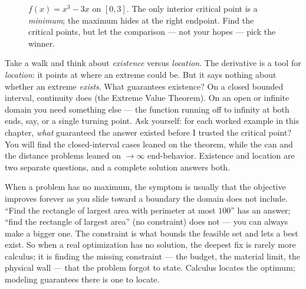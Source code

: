 \begin{figure}[H]
\centering
{}
\caption{$f(x)=x^3-3x$ on $[0,3]$. The only interior critical point is a
\emph{minimum}; the maximum hides at the right endpoint. Find the critical points,
but let the comparison --- not your hopes --- pick the winner.}
\label{ch17:fig-endpoint}
\end{figure}

\begin{walkbox}
Take a walk and think about \emph{existence} versus \emph{location}. The derivative
is a tool for \emph{location}: it points at where an extreme could be. But it says
nothing about whether an extreme \emph{exists}. What guarantees existence? On a closed
bounded interval, continuity does (the Extreme Value Theorem). On an open or infinite
domain you need something else --- the function running off to infinity at both ends,
say, or a single turning point. Ask yourself: for each worked example in this chapter,
\emph{what} guaranteed the answer existed before I trusted the critical point? You
will find the closed-interval cases leaned on the theorem, while the can and the
distance problems leaned on $\to\infty$ end-behavior. Existence and location are two
separate questions, and a complete solution answers both.
\end{walkbox}

\begin{happeningbox}
When a problem has no maximum, the symptom is usually that the objective improves
forever as you slide toward a boundary the domain does not include. ``Find the
rectangle of largest area with perimeter at most $100$'' has an answer; ``find the
rectangle of largest area'' (no constraint) does not --- you can always make a bigger
one. The constraint is what bounds the feasible set and lets a best exist. So when a
real optimization has no solution, the deepest fix is rarely more calculus; it is
finding the missing constraint --- the budget, the material limit, the physical wall ---
that the problem forgot to state. Calculus locates the optimum; modeling guarantees
there is one to locate.
\end{happeningbox}

